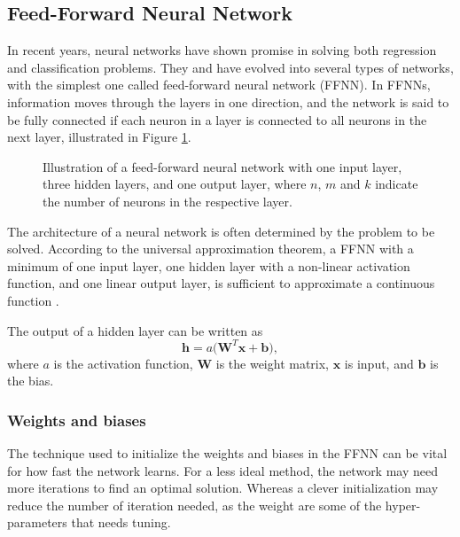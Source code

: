\subsection{Feed-Forward Neural Network}\label{ssec:ffnn}
In recent years, neural networks have shown promise in solving both regression and classification problems. They and have evolved into several types of networks, with the simplest one called feed-forward neural network (FFNN). In FFNNs, information moves through the layers in one direction, and the network is said to be fully connected if each neuron in a layer is connected to all neurons in the next layer, illustrated in Figure \ref{fig:ffnn}. 

\begin{figure}[h!]
    \centering
    \resizebox{0.9\linewidth}{!}
    {}
    \caption{Illustration of a feed-forward neural network with one input layer, three hidden layers, and one output layer, where $n$, $m$ and $k$ indicate the number of neurons in the respective layer.}
    \label{fig:ffnn}
\end{figure}
The architecture of a neural network is often determined by the problem to be solved. According to the universal 
approximation theorem, a FFNN with a minimum of one input layer, one hidden layer with a non-linear activation 
function, and one linear output layer, is sufficient to approximate a continuous function \cite[194]{Goodfellow:2016:deep_learning}. 

The output of a hidden layer can be written as 
\begin{equation}\label{eq:ffnn}
    \mathbf{h} = a \Big( \mathbf{W}^{T} \mathbf{x} + \mathbf{b} \Big) ,
\end{equation}
where $a$ is the activation function, $\mathbf{W}$ is the weight matrix, $\mathbf{x}$ is input, and $\mathbf{b}$ is the bias. 

\subsubsection{Weights and biases}\label{sssec:weights_biases}
The technique used to initialize the weights and biases in the FFNN can be vital for how fast the network learns. 
For a less ideal method, the network may need more iterations to find an optimal solution. 
Whereas a clever initialization may reduce the number of iteration needed, as the weight are some of the 
hyper-parameters that needs tuning. 

